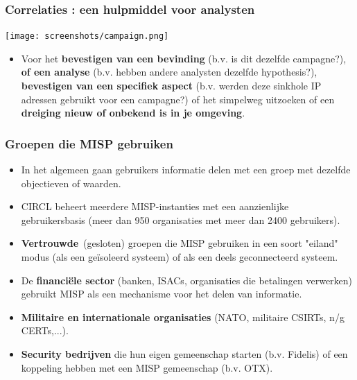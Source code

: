 \begin{frame}
        \frametitle{Correlaties : een hulpmiddel voor analysten}
        \texttt{[image: screenshots/campaign.png]}
        \begin{itemize}
                \item Voor het {\bf  bevestigen van een bevinding} (b.v. is dit dezelfde campagne?), {\bf of een analyse} (b.v. hebben andere analysten dezelfde hypothesis?), {\bf bevestigen van een specifiek aspect} (b.v. werden deze sinkhole IP adressen gebruikt voor een campagne?) of het simpelweg uitzoeken of een {\bf dreiging nieuw of onbekend is in je omgeving}.
        \end{itemize}
\end{frame}


\begin{frame}
 \frametitle{Groepen die MISP gebruiken}
 \begin{itemize}
	 \item In het algemeen gaan gebruikers informatie delen met een groep met dezelfde objectieven of waarden.
	 \item CIRCL beheert meerdere MISP-instanties met een aanzienlijke gebruikersbasis (meer dan 950 organisaties met meer dan 2400 gebruikers).
     \item {\bf Vertrouwde} (gesloten) groepen die MISP gebruiken in een soort "eiland" modus (als een geïsoleerd systeem) of als een deels geconnecteerd systeem.
	 \item De {\bf financiële sector} (banken, ISACs, organisaties die betalingen verwerken) gebruikt MISP als een mechanisme voor het delen van informatie.
	 \item {\bf Militaire en internationale organisaties} (NATO, militaire CSIRTs, n/g CERTs,...).
	 \item {\bf Security bedrijven} die hun eigen gemeenschap starten (b.v. Fidelis) of een koppeling hebben met een MISP gemeenschap (b.v. OTX).
 \end{itemize}
\end{frame}


